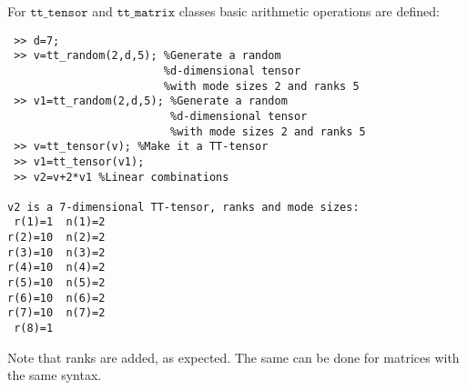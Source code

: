 \documentclass[a4paper,12pt,twoside]{article}
\def\tt{\texttt{tt\_tensor}}
\def\ttm{\texttt{tt\_matrix}}
\begin{document}
For $\tt$ and $\ttm$ classes basic arithmetic operations are defined:
\begin{lstlisting}
 >> d=7;
 >> v=tt_random(2,d,5); %Generate a random 
                        %d-dimensional tensor 
                        %with mode sizes 2 and ranks 5
 >> v1=tt_random(2,d,5); %Generate a random 
                         %d-dimensional tensor 
                         %with mode sizes 2 and ranks 5
 >> v=tt_tensor(v); %Make it a TT-tensor
 >> v1=tt_tensor(v1); 
 >> v2=v+2*v1 %Linear combinations
 
v2 is a 7-dimensional TT-tensor, ranks and mode sizes: 
 r(1)=1  n(1)=2
r(2)=10  n(2)=2
r(3)=10  n(3)=2
r(4)=10  n(4)=2
r(5)=10  n(5)=2
r(6)=10  n(6)=2
r(7)=10  n(7)=2
 r(8)=1        
\end{lstlisting}
Note that ranks are added, as expected. The same can be done for matrices with the same syntax.
\end{document}
